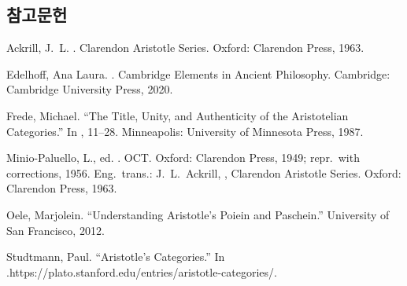 \documentclass[12pt, a4paper]{article}
\begin{document}
\subsection*{참고문헌}
\begin{references}

 Ackrill, J.\ L. . Clarendon Aristotle Series. Oxford: Clarendon Press, 1963.

 Edelhoff, Ana Laura. . Cambridge Elements in Ancient Philosophy. Cambridge: Cambridge University Press, 2020.

 Frede, Michael. ``The Title, Unity, and Authenticity of the Aristotelian Categories.'' In , 11--28. Minneapolis: University of Minnesota Press, 1987.

 Minio-Paluello, L., ed. . OCT. Oxford: Clarendon Press, 1949; repr.\ with corrections, 1956. Eng.\ trans.: J.\ L.\ Ackrill, , Clarendon Aristotle Series. Oxford: Clarendon Press, 1963.

 Oele, Marjolein. ``Understanding Aristotle's Poiein and Paschein.'' University of San Francisco, 2012.

 Studtmann, Paul. ``Aristotle's Categories.'' In .\newline https://plato.stanford.edu/entries/aristotle-categories/.

\end{references}
\end{document}
